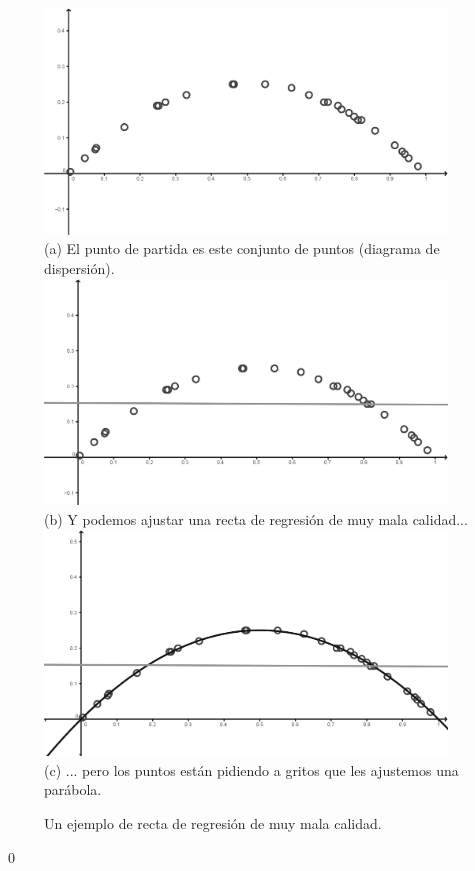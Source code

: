 \begin{ejemplo}
\begin{figure}[p]
\begin{center}
\begin{bn}
\includegraphics[height=6cm]{../fig/Cap10-EjemploRectaMalaAproximacion01a-bn.png}\\
(a) El punto de partida es este conjunto de puntos (diagrama de dispersi\'on).\\
\includegraphics[height=6cm]{../fig/Cap10-EjemploRectaMalaAproximacion01b-bn.png}\\
(b) Y podemos ajustar una recta de regresi\'on de muy mala calidad...
\includegraphics[height=6cm]{../fig/Cap10-EjemploRectaMalaAproximacion01c-bn.png}\\
(c) ... pero los puntos est\'an pidiendo a gritos que les ajustemos una par\'abola.
\end{bn}
\caption{Un ejemplo de recta de regresión de muy mala calidad.}
\label{cap10:fig:EjemploRectaMalaAproximacion01}
\end{center}
\end{figure}

\qed
\end{ejemplo}

